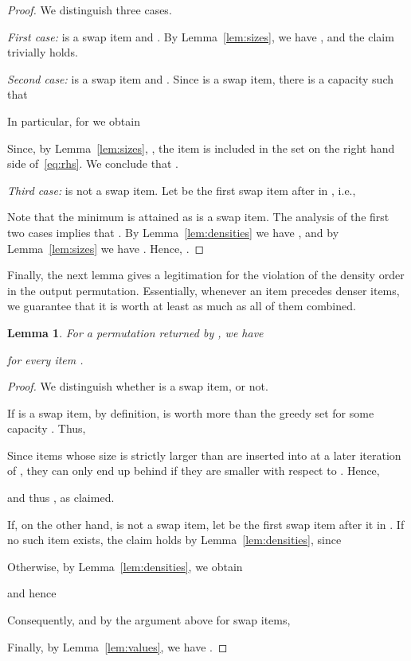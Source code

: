 \documentclass[11pt]{article}
\newtheorem{lemma}[theorem]{Lemma}
\begin{document}
\begin{proof}
We distinguish three cases.

\emph{First case:}  is a swap item and .
By Lemma~\ref{lem:sizes}, we have ,
and the claim trivially holds.

\emph{Second case:}  is a swap item and .
Since  is a swap item, there is a capacity 
such that

In particular, for  we obtain



Since, by Lemma~\ref{lem:sizes}, , the
item  is included in the set on the right hand side of~\eqref{eq:rhs}.
We conclude that .

\emph{Third case:}  is not a swap item. Let 
be the first swap item after  in , i.e., 

Note that the minimum is attained as  is a swap item. The
analysis of the first two cases implies that .
By Lemma~\ref{lem:densities} we have ,
and by Lemma~\ref{lem:sizes} we have .
Hence, .  
\end{proof}
Finally, the next lemma gives a legitimation for the violation of
the density order in the output permutation. Essentially, whenever
an item precedes denser items, we guarantee that it is worth at least
as much as all of them combined.
\begin{lemma}
For a permutation  returned by , we have

for every item . \label{lem:order_violation_legitimation} \end{lemma}
\begin{proof}
We distinguish whether  is a swap item, or not.

If  is a swap item, by definition,  is worth more
than the greedy set for some capacity . Thus,

 Since items whose size is strictly larger than  are
inserted into  at a later iteration of ,
they can only end up behind  if they are smaller with respect
to . Hence, 

and thus ,
as claimed.

If, on the other hand,  is not a swap item, let 
be the first swap item after it in . If no such item exists,
the claim holds by Lemma~\ref{lem:densities}, since 

Otherwise, by Lemma~\ref{lem:densities}, we obtain

and hence 

Consequently, and by the argument above for swap items, 

Finally, by Lemma~\ref{lem:values}, we have .
\end{proof}
\end{document}
